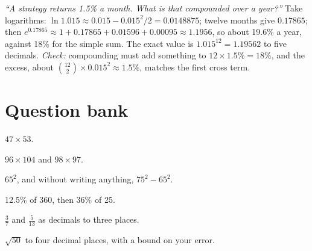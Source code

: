 \begin{example}\label{ex:iv:mental-arithmetic:annualise}
\emph{``A strategy returns 1.5\% a month. What is that compounded over a year?''} Take logarithms:
$\ln 1.015 \approx 0.015 - 0.015^2/2 = 0.0148875$; twelve months give $0.17865$; then $e^{0.17865} \approx 1 + 0.17865 +
0.01596 + 0.00095 \approx 1.1956$, so about 19.6\% a year, against 18\% for the simple sum. The exact value is
$1.015^{12} = 1.19562$ to five decimals. \emph{Check:} compounding must add something to $12 \times 1.5\% = 18\%$, and the
excess, about $\binom{12}{2} \times 0.015^2 \approx 1.5\%$, matches the first cross term.
\end{example}

\section{Question bank}

\begin{interviewq}\label{iq:iv:mental-arithmetic:1}
$47 \times 53$.
\end{interviewq}

\begin{interviewq}\label{iq:iv:mental-arithmetic:2}
$96 \times 104$ and $98 \times 97$.
\end{interviewq}

\begin{interviewq}\label{iq:iv:mental-arithmetic:3}
$65^2$, and without writing anything, $75^2 - 65^2$.
\end{interviewq}

\begin{interviewq}\label{iq:iv:mental-arithmetic:4}
12.5\% of 360, then 36\% of 25.
\end{interviewq}

\begin{interviewq}\label{iq:iv:mental-arithmetic:5}
$\tfrac37$ and $\tfrac5{13}$ as decimals to three places.
\end{interviewq}

\begin{interviewq}\label{iq:iv:mental-arithmetic:6}
$\sqrt{50}$ to four decimal places, with a bound on your error.
\end{interviewq}

